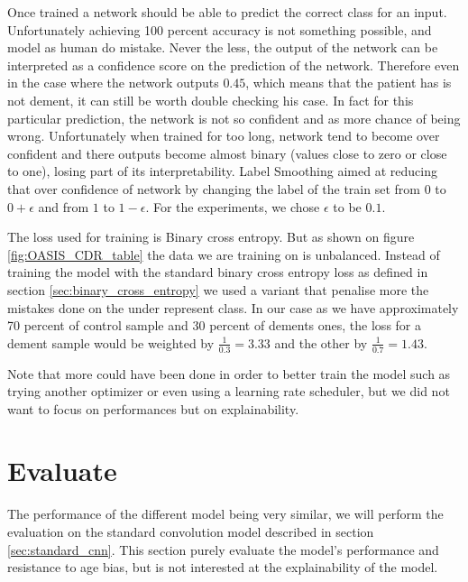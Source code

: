 Once trained a network should be able to predict the correct class for an input. Unfortunately achieving 100 percent accuracy is not something possible, and model as human do mistake. Never the less, the output of the network can be interpreted as a confidence score on the prediction of the network. Therefore even in the case where the network outputs $0.45$, which means that the patient has is not dement, it can still be worth double checking his case. In fact for this particular prediction, the network is not so confident and as more chance of being wrong. Unfortunately when trained for too long, network tend to become over confident and there outputs become almost binary (values close to zero or close to one), losing part of its interpretability. Label Smoothing \cite{label_smoothing_szegedy2015rethinking} aimed at reducing that over confidence of network by changing the label of the train set from $0$ to $0 + \epsilon$ and from $1$ to $1 - \epsilon$. For the experiments, we chose $\epsilon$ to be $0.1$.

The loss used for training is Binary cross entropy. But as shown on figure \ref{fig:OASIS_CDR_table} the data we are training on is unbalanced. Instead of training the model with the standard binary cross entropy loss as defined in section \ref{sec:binary_cross_entropy} we used a variant that penalise more the mistakes done on the under represent class. In our case as we have approximately 70 percent of control sample and 30 percent of dements ones, the loss for a dement sample would be weighted by $\frac{1}{0.3} = 3.33$ and the other by $\frac{1}{0.7} = 1.43$.

Note that more could have been done in order to better train the model such as trying another optimizer or even using a learning rate scheduler, but we did not want to focus on performances but on explainability.

\section{Evaluate}
The performance of the different model being very similar, we will perform the evaluation on the standard convolution model described in section \ref{sec:standard_cnn}. This section purely evaluate the model's performance and resistance to age bias, but is not interested at the explainability of the model. 


